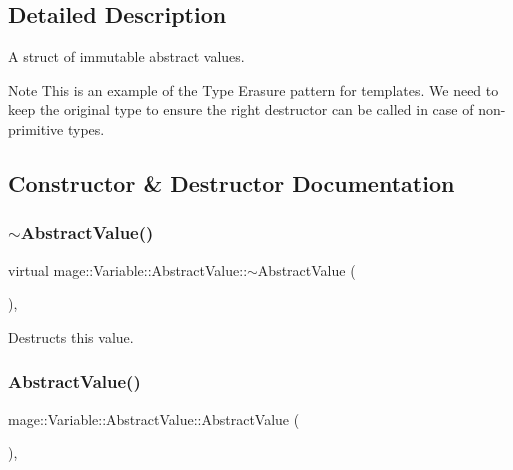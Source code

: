 \subsection{Detailed Description}
A struct of immutable abstract values.

\begin{DoxyNote}{Note}
This is an example of the Type Erasure pattern for templates. We need to keep the original type to ensure the right destructor can be called in case of non-\/primitive types. 
\end{DoxyNote}


\subsection{Constructor \& Destructor Documentation}
\hypertarget{structmage_1_1_variable_1_1_abstract_value_a7fa8fc14f81bb26f239af5f1263888a5}{}\label{structmage_1_1_variable_1_1_abstract_value_a7fa8fc14f81bb26f239af5f1263888a5} 
\subsubsection{\texorpdfstring{$\sim$\+Abstract\+Value()}{~AbstractValue()}}
{\footnotesize\ttfamily virtual mage\+::\+Variable\+::\+Abstract\+Value\+::$\sim$\+Abstract\+Value (\begin{DoxyParamCaption}{ }\end{DoxyParamCaption})\hspace{0.3cm}{\ttfamily [virtual]}, {\ttfamily [default]}}

Destructs this value. \hypertarget{structmage_1_1_variable_1_1_abstract_value_a0a96662d36697af8a17b88f6a2d8efca}{}\label{structmage_1_1_variable_1_1_abstract_value_a0a96662d36697af8a17b88f6a2d8efca} 
\subsubsection{\texorpdfstring{Abstract\+Value()}{AbstractValue()}\hspace{0.1cm}{\footnotesize\ttfamily [1/2]}}
{\footnotesize\ttfamily mage\+::\+Variable\+::\+Abstract\+Value\+::\+Abstract\+Value (\begin{DoxyParamCaption}{ }\end{DoxyParamCaption})\hspace{0.3cm}{\ttfamily [protected]}, {\ttfamily [default]}}


